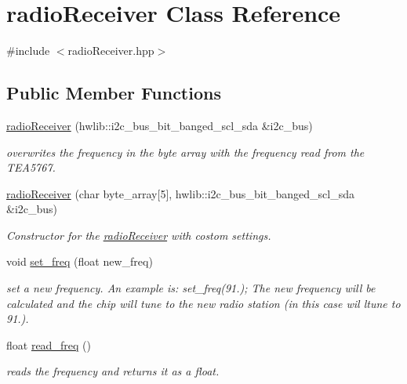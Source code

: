 \hypertarget{classradio_receiver}{}\section{radio\+Receiver Class Reference}
\label{classradio_receiver}


{\ttfamily \#include $<$radio\+Receiver.\+hpp$>$}

\subsection*{Public Member Functions}
\begin{DoxyCompactItemize}
\item 
\hyperlink{classradio_receiver_ad40aeb52139ece882e24191e1ac6590e}{radio\+Receiver} (hwlib\+::i2c\+\_\+bus\+\_\+bit\+\_\+banged\+\_\+scl\+\_\+sda \&i2c\+\_\+bus)
\begin{DoxyCompactList}\small\item\em overwrites the frequency in the byte array with the frequency read from the T\+E\+A5767. \end{DoxyCompactList}\item 
\hyperlink{classradio_receiver_a33dafbceb153032b6250077c273bd844}{radio\+Receiver} (char byte\+\_\+array\mbox{[}5\mbox{]}, hwlib\+::i2c\+\_\+bus\+\_\+bit\+\_\+banged\+\_\+scl\+\_\+sda \&i2c\+\_\+bus)
\begin{DoxyCompactList}\small\item\em Constructor for the \hyperlink{classradio_receiver}{radio\+Receiver} with costom settings. \end{DoxyCompactList}\item 
void \hyperlink{classradio_receiver_ae3f3be92bf716be1933cb3f563935e02}{set\+\_\+freq} (float new\+\_\+freq)
\begin{DoxyCompactList}\small\item\em set a new frequency. An example is\+: set\+\_\+freq(91.); The new frequency will be calculated and the chip will tune to the new radio station (in this case wil ltune to 91.). \end{DoxyCompactList}\item 
float \hyperlink{classradio_receiver_a953b6a00907b39e78f89fe0b335ce520}{read\+\_\+freq} ()
\begin{DoxyCompactList}\small\item\em reads the frequency and returns it as a float. \end{DoxyCompactList}\item 

\end{DoxyCompactItemize}
